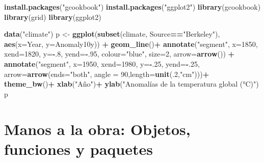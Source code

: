 \documentclass[
]{article}
\newenvironment{Shaded}{\begin{snugshade}}{\end{snugshade}}
\newcommand{\DataTypeTok}[1]{\textcolor[rgb]{0.13,0.29,0.53}{#1}}
\newcommand{\DecValTok}[1]{\textcolor[rgb]{0.00,0.00,0.81}{#1}}
\newcommand{\KeywordTok}[1]{\textcolor[rgb]{0.13,0.29,0.53}{\textbf{#1}}}
\newcommand{\NormalTok}[1]{#1}
\newcommand{\OperatorTok}[1]{\textcolor[rgb]{0.81,0.36,0.00}{\textbf{#1}}}
\newcommand{\StringTok}[1]{\textcolor[rgb]{0.31,0.60,0.02}{#1}}
\begin{document}
\begin{Shaded}
\begin{Highlighting}[]
\KeywordTok{install.packages}\NormalTok{(}\StringTok{"gcookbook"}\NormalTok{)}
\KeywordTok{install.packages}\NormalTok{(}\StringTok{"ggplot2"}\NormalTok{)}
\KeywordTok{library}\NormalTok{(gcookbook)}
\KeywordTok{library}\NormalTok{(grid)}
\KeywordTok{library}\NormalTok{(ggplot2)}

\KeywordTok{data}\NormalTok{(}\StringTok{"climate"}\NormalTok{)}
\NormalTok{p <-}\StringTok{ }\KeywordTok{ggplot}\NormalTok{(}\KeywordTok{subset}\NormalTok{(climate, Source}\OperatorTok{==}\StringTok{"Berkeley"}\NormalTok{), }\KeywordTok{aes}\NormalTok{(}\DataTypeTok{x=}\NormalTok{Year, }\DataTypeTok{y=}\NormalTok{Anomaly10y)) }\OperatorTok{+}
\StringTok{      }\KeywordTok{geom_line}\NormalTok{()}\OperatorTok{+}
\StringTok{      }\KeywordTok{annotate}\NormalTok{(}\StringTok{"segment"}\NormalTok{, }\DataTypeTok{x=}\DecValTok{1850}\NormalTok{, }\DataTypeTok{xend=}\DecValTok{1820}\NormalTok{, }\DataTypeTok{y=}\OperatorTok{-}\NormalTok{.}\DecValTok{8}\NormalTok{, }\DataTypeTok{yend=}\OperatorTok{-}\NormalTok{.}\DecValTok{95}\NormalTok{, }\DataTypeTok{colour=}\StringTok{"blue"}\NormalTok{, }\DataTypeTok{size=}\DecValTok{2}\NormalTok{, }\DataTypeTok{arrow=}\KeywordTok{arrow}\NormalTok{()) }\OperatorTok{+}
\StringTok{      }\KeywordTok{annotate}\NormalTok{(}\StringTok{"segment"}\NormalTok{, }\DataTypeTok{x=}\DecValTok{1950}\NormalTok{, }\DataTypeTok{xend=}\DecValTok{1980}\NormalTok{, }\DataTypeTok{y=}\OperatorTok{-}\NormalTok{.}\DecValTok{25}\NormalTok{, }\DataTypeTok{yend=}\OperatorTok{-}\NormalTok{.}\DecValTok{25}\NormalTok{, }\DataTypeTok{arrow=}\KeywordTok{arrow}\NormalTok{(}\DataTypeTok{ends=}\StringTok{"both"}\NormalTok{, }\DataTypeTok{angle =} \DecValTok{90}\NormalTok{,}\DataTypeTok{length=}\KeywordTok{unit}\NormalTok{(.}\DecValTok{2}\NormalTok{,}\StringTok{"cm"}\NormalTok{)))}\OperatorTok{+}
\StringTok{      }\KeywordTok{theme_bw}\NormalTok{()}\OperatorTok{+}
\StringTok{      }\KeywordTok{xlab}\NormalTok{(}\StringTok{"Año"}\NormalTok{)}\OperatorTok{+}
\StringTok{      }\KeywordTok{ylab}\NormalTok{(}\StringTok{"Anomalías de la temperatura global (°C)"}\NormalTok{)}
\NormalTok{p  }
\end{Highlighting}
\end{Shaded}

\hypertarget{manos-a-la-obra-objetos-funciones-y-paquetes}{%
\section{Manos a la obra: Objetos, funciones y
paquetes}\label{manos-a-la-obra-objetos-funciones-y-paquetes}}
\end{document}
